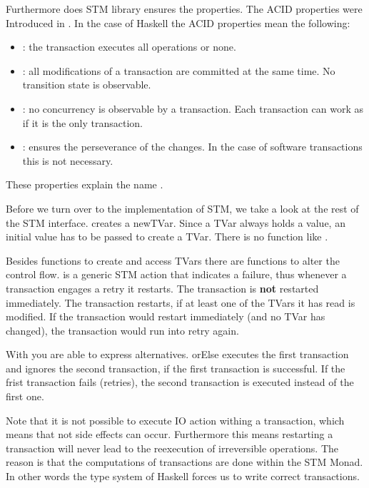 Furthermore does STM library ensures the  properties. The ACID properties were Introduced in \parencite{DBTrans}.
In the case of Haskell the ACID properties mean the following:
\begin{itemize}
 \item {}: the transaction executes all operations or none.
 \item {}: all modifications of a transaction are committed at the same time. No transition state is observable.
 \item {}: no concurrency is observable by a transaction. Each transaction can work as if it is the only transaction.
 \item {}: ensures the perseverance of the changes. In the case of software transactions this is not necessary.
\end{itemize}
These properties explain the name . 

Before we turn over to the implementation of STM, we take a look at the rest
of the STM interface.  creates a newTVar. Since a TVar always holds a value, an initial value has to be
passed to create a TVar. There is no function like . 

Besides functions to create and access TVars there are functions to alter the control flow.
 is a generic STM action that indicates a failure, thus whenever a transaction engages a retry it restarts. The transaction
is \textbf{not} restarted immediately. The transaction restarts, if at least one of the TVars it has read is modified. If the transaction would
restart immediately (and no TVar has changed), the transaction would run into retry again. 

With  you are able to express alternatives. orElse executes the first transaction
and ignores the second transaction, if the first transaction is successful. If the frist transaction fails (retries), the second transaction is 
executed instead of the first one.

Note that it is not possible to execute IO action withing a transaction, which means that not side effects can occur. Furthermore this means
restarting a transaction will never lead to the reexecution of irreversible operations. The reason is that the computations of transactions
are done within the STM Monad. In other words the type system of Haskell forces us to write correct transactions. 

